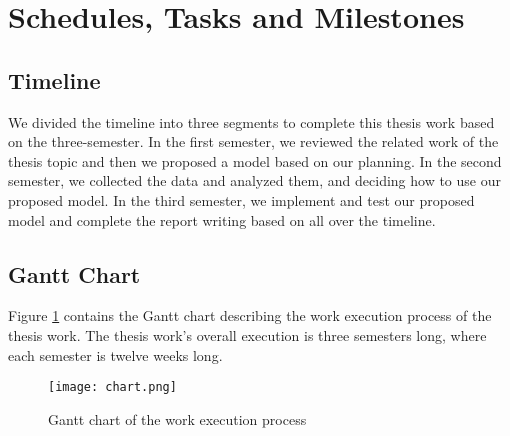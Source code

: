 \section{Schedules, Tasks and Milestones}
\subsection{Timeline}
We divided the timeline into three segments to complete this thesis work based on the three-semester. In the first semester, we reviewed the related work of the thesis topic and then we proposed a model based on our planning. In the second semester, we collected the data and analyzed them, and deciding how to use our proposed model. In the third semester, we implement and test our proposed model and complete the report writing based on all over the timeline.

\subsection{Gantt Chart}
Figure \ref{fig18} contains the Gantt chart describing the work execution process of the thesis
work. The thesis work’s overall execution is three semesters long, where each semester
is twelve weeks long.

\begin{figure}[htbp]
\centerline{\texttt{[image: chart.png]}}
\caption{Gantt chart of the work execution process }
\label{fig18}
\end{figure}
